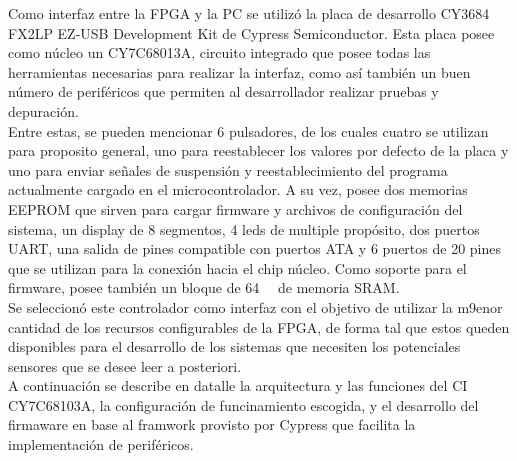 	Como interfaz entre la FPGA y la PC se utilizó la placa de desarrollo CY3684 FX2LP EZ-USB Development Kit de Cypress Semiconductor. Esta placa posee como núcleo un CY7C68013A, circuito integrado que posee todas las herramientas necesarias para realizar la interfaz, como así también un buen número de periféricos que permiten al desarrollador realizar pruebas y depuración.\\
	
	Entre estas, se pueden mencionar 6 pulsadores, de los cuales cuatro se utilizan para proposito general, uno para reestablecer los valores por defecto de la placa y uno para enviar señales de suspensión y reestablecimiento del programa actualmente cargado en el microcontrolador. A su vez, posee dos memorias EEPROM que sirven para cargar firmware y archivos de configuración del sistema, un display de 8 segmentos, 4 leds de multiple propósito, dos puertos UART, una salida de pines compatible con puertos ATA y 6 puertos de 20 pines que se utilizan para la conexión hacia el chip núcleo. Como soporte para el firmware, posee también un bloque de \SI{64}{\kilo\byte} de memoria SRAM.\\
	
	Se seleccionó este controlador como interfaz con el objetivo de utilizar la m9enor cantidad de los recursos configurables de la FPGA, de forma tal que estos queden disponibles para el desarrollo de los sistemas que necesiten los potenciales sensores que se desee leer a posteriori.\\
	
	A continuación se describe en datalle la arquitectura y las funciones del CI CY7C68103A, la configuración de funcinamiento escogida, y el desarrollo del firmaware en base al framwork provisto por Cypress que facilita la implementación de periféricos.\\
	